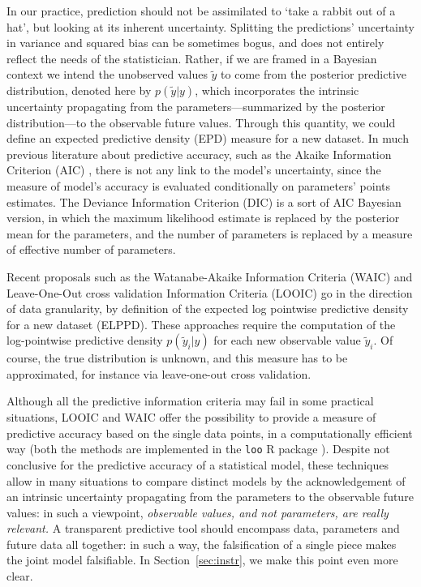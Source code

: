 \documentclass{statsoc}
\begin{document}
In our practice, prediction should not be assimilated to `take a rabbit out of a hat', but looking at its inherent uncertainty. Splitting the predictions' uncertainty in variance and 
squared bias can be sometimes bogus, and does not entirely reflect the needs of the statistician. Rather, if we are framed in a Bayesian context we intend the unobserved values $\tilde{y}$ to come from the posterior predictive distribution, denoted here by $p(\tilde{y}|y)$, which incorporates the intrinsic uncertainty propagating from the parameters---summarized by the posterior distribution---to the observable future values. Through this quantity, we could define an expected predictive density (EPD) measure for a new dataset.  In much previous literature 
about predictive accuracy, such as the Akaike Information Criterion (AIC) \citep{akaike1973information}, there is not any link to the model's uncertainty, since the 
measure of model's accuracy is evaluated conditionally on parameters' points estimates. The Deviance Information Criterion (DIC) \citep{spiegelhalter2002bayesian} is a sort of AIC 
Bayesian version, in which the maximum likelihood estimate is replaced by the posterior mean for the parameters, and the number of parameters is replaced by a measure of effective number of parameters. 

Recent proposals such as the Watanabe-Akaike Information Criteria (WAIC) \citep{watanabe2010asymptotic} and Leave-One-Out cross validation Information Criteria (LOOIC) \citep{vehtari2017practical} go in the direction of data granularity, by definition of the expected log pointwise predictive density
for a new dataset (ELPPD). These approaches require the computation of the log-pointwise predictive density $p(\tilde{y}_{i}|y)$ for each new observable value $\tilde{y}_i$. Of course, the true distribution is unknown, and this measure has to be approximated, for instance via leave-one-out cross validation.

Although all the predictive information criteria may fail in some practical situations, LOOIC and WAIC offer the possibility to provide a measure of predictive accuracy based on the single data points, in a computationally efficient way (both the methods are 
implemented in the {\tt loo} R package \citep{loo}). Despite not conclusive for the predictive accuracy of a statistical model, these techniques allow in many situations to compare distinct models by the acknowledgement of an intrinsic uncertainty propagating from the parameters to the observable future values: in such a viewpoint, \emph{observable values, and not parameters, are really relevant.}
 A transparent predictive tool should encompass data, parameters and future data all together: in such a way, the falsification of a single piece makes the joint model falsifiable. In Section~\ref{sec:instr}, we make this point even more clear.
\end{document}
